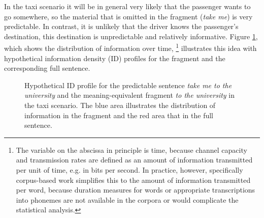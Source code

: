 In the taxi scenario it will be in general very likely that the passenger wants to go somewhere, so the material that is omitted in the fragment (\textit{take me}) is very predictable. In contrast, it is unlikely that the driver knows the passenger's destination, this destination is unpredictable and relatively informative. Figure \ref{fig:fragments-uid-predictable}, which shows the distribution of information over time,%
%
\footnote{The variable on the abscissa in principle is time, because channel capacity and transmission rates are defined as an amount of information transmitted per unit of time, e.g. in bits per second. In practice, however, specifically corpus-based work \citep[see e.g.][]{levy.jaeger2007, frank.jaeger2008, jaeger2010} simplifies this to the amount of information transmitted per word, because duration measures for words or appropriate transcriptions into phonemes are not available in the corpora or would complicate the statistical analysis.}\afterfn%
%
illustrates this idea with hypothetical information density (ID) profiles for the fragment and the corresponding full sentence. 

\begin{figure}[t]
\begin{minipage}{\textwidth}
\end{minipage}
 \caption{Hypothetical ID profile for the predictable sentence \textit{take me to the university} and the meaning-equivalent fragment \textit{to the university} in the taxi scenario. The blue area illustrates the distribution of information in the fragment and the red area that in the full sentence.\label{fig:fragments-uid-predictable}}
\end{figure}

